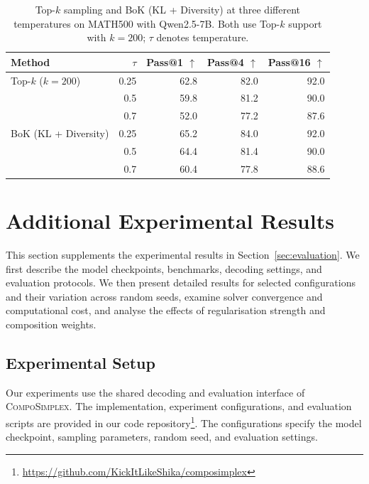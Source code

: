 \documentclass{article} %
\begin{document}
\begin{table}[t]
    \centering
    \small
    \setlength{\tabcolsep}{7pt}
    \renewcommand{\arraystretch}{1.1}
    \caption{Top-$k$ sampling and BoK (KL + Diversity) at three
    different temperatures on MATH500 with Qwen2.5-7B.
    Both use Top-$k$ support with $k=200$; $\tau$ denotes temperature.}
    \label{tab:bok-temperature}
    \begin{tabular}{lrrrr}
        \toprule
        \textbf{Method} & \textbf{$\tau$}
        & \textbf{Pass@1 $\uparrow$}
        & \textbf{Pass@4 $\uparrow$}
        & \textbf{Pass@16 $\uparrow$} \\
        \midrule
        Top-$k$ ($k=200$)
        & 0.25 & 62.8 & 82.0 & 92.0 \\
        & 0.5 & 59.8 & 81.2 & 90.0 \\
        & 0.7 & 52.0 & 77.2 & 87.6 \\
        \midrule
        BoK (KL + Diversity)
        & 0.25 & 65.2 & 84.0 & 92.0 \\
        & 0.5 & 64.4 & 81.4 & 90.0 \\
        & 0.7 & 60.4 & 77.8 & 88.6 \\
        \bottomrule
    \end{tabular}
\end{table}

\section{Additional Experimental Results}\label{app:EvalDetails}
This section supplements the experimental results in Section~\ref{sec:evaluation}. We first describe the model checkpoints, benchmarks, decoding settings, and
evaluation protocols. We then present detailed results for selected configurations and their variation across random seeds, examine solver convergence and computational cost, and analyse the effects of regularisation strength and composition weights.

\subsection{Experimental Setup}
\label{app:experimental-setup}
Our experiments use the shared decoding and evaluation interface of \textsc{CompoSimplex}. The implementation, experiment configurations, and evaluation scripts are provided in our code repository\footnote{\url{https://github.com/KickItLikeShika/composimplex}}.
The configurations specify the model checkpoint, sampling parameters, random seed, and evaluation settings.
\end{document}
